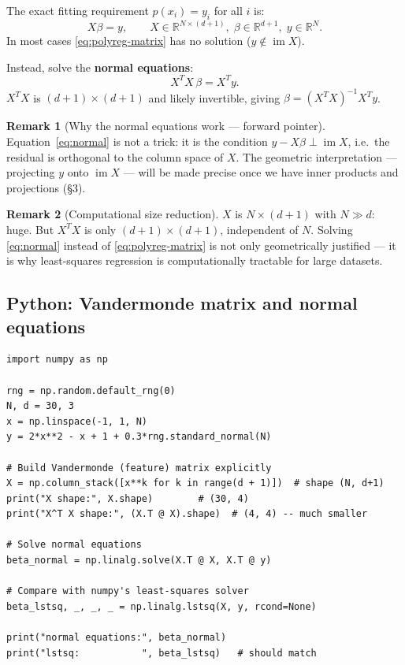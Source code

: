 \documentclass[11pt]{article}
\theoremstyle{definition}
\newtheorem{remark}{Remark}[section]
\theoremstyle{plain}
\begin{document}
The exact fitting requirement $p(x_i) = y_i$ for all $i$ is:
\begin{equation}\label{eq:polyreg-matrix}
  \tag{$*$} X\beta = y,
  \qquad X \in \mathbb{R}^{N\times(d+1)},\;
  \beta \in \mathbb{R}^{d+1},\;
  y \in \mathbb{R}^N.
\end{equation}
In most cases \eqref{eq:polyreg-matrix} has no solution ($y \notin \operatorname{im}X$).

\medskip\noindent
Instead, solve the \textbf{normal equations}:
\begin{equation}\label{eq:normal}
  \tag{$**$} X^T X\,\beta = X^T y.
\end{equation}
$X^TX$ is $(d+1)\times(d+1)$ and likely invertible, giving $\beta = (X^TX)^{-1}X^Ty$.

\begin{remark}[Why the normal equations work --- forward pointer]
  Equation~\eqref{eq:normal} is not a trick: it is the condition
  $y - X\beta \perp \operatorname{im}X$, i.e.\ the residual is orthogonal
  to the column space of $X$.  The geometric interpretation --- projecting
  $y$ onto $\operatorname{im}X$ --- will be made precise once we have inner
  products and projections (\S3).
\end{remark}

\begin{remark}[Computational size reduction]
  $X$ is $N\times(d+1)$ with $N \gg d$: huge.  But $X^TX$ is only
  $(d+1)\times(d+1)$, independent of $N$.  Solving \eqref{eq:normal}
  instead of \eqref{eq:polyreg-matrix} is not only geometrically
  justified --- it is why least-squares regression is computationally
  tractable for large datasets.
\end{remark}

\subsection{Python: Vandermonde matrix and normal equations}
\begin{lstlisting}
import numpy as np

rng = np.random.default_rng(0)
N, d = 30, 3
x = np.linspace(-1, 1, N)
y = 2*x**2 - x + 1 + 0.3*rng.standard_normal(N)

# Build Vandermonde (feature) matrix explicitly
X = np.column_stack([x**k for k in range(d + 1)])  # shape (N, d+1)
print("X shape:", X.shape)        # (30, 4)
print("X^T X shape:", (X.T @ X).shape)  # (4, 4) -- much smaller

# Solve normal equations
beta_normal = np.linalg.solve(X.T @ X, X.T @ y)

# Compare with numpy's least-squares solver
beta_lstsq, _, _, _ = np.linalg.lstsq(X, y, rcond=None)

print("normal equations:", beta_normal)
print("lstsq:           ", beta_lstsq)   # should match
\end{lstlisting}
\end{document}
